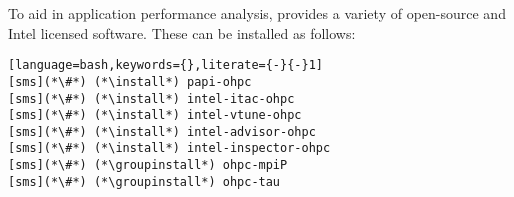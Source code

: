 To aid in application performance analysis, \OHPC{} provides a variety of
open-source and Intel licensed software. These can be installed as follows:

\begin{lstlisting}[language=bash,keywords={},literate={-}{-}1]
[sms](*\#*) (*\install*) papi-ohpc
[sms](*\#*) (*\install*) intel-itac-ohpc
[sms](*\#*) (*\install*) intel-vtune-ohpc
[sms](*\#*) (*\install*) intel-advisor-ohpc
[sms](*\#*) (*\install*) intel-inspector-ohpc
[sms](*\#*) (*\groupinstall*) ohpc-mpiP
[sms](*\#*) (*\groupinstall*) ohpc-tau
\end{lstlisting}
